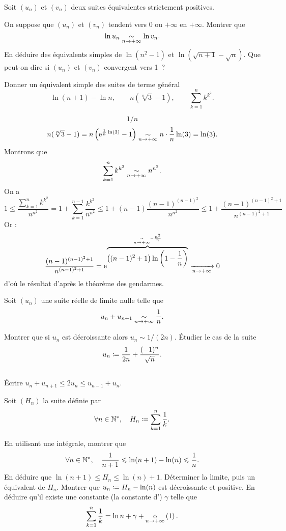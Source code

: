 \documentclass{magnolia}
\begin{document}



Soit $(u_n)$ et $(v_n)$ deux suites équivalentes strictement positives.
\begin{questions}
\question On suppose que $(u_n)$ et $(v_n)$ tendent vers $0$ ou $+\infty$ en
$+\infty$. Montrer que
\[\ln u_n \underset{n\rightarrow +\infty}{\sim} \ln v_n.\]
En déduire des équivalents simples de $\ln(n^2-1)$ et $\ln(\sqrt{n+1}-\sqrt{n})$.
\question Que peut-on dire si $(u_n)$ et $(v_n)$ convergent vers 1~?
\end{questions}

Donner un équivalent simple des suites de terme général
\[\ln(n+1)-\ln n, \qquad n(\sqrt[n]{3}-1), \qquad \sum_{k=1}^n k^{k^2}.\]

\begin{sol}
$$1/n$$
$$n(\sqrt[n]{3}-1)=n\left({\rm e}^{\frac{1}{n}\ln(3)}-1\right)\underset{n\rightarrow +\infty}{\sim}n\cdot \frac{1}{n}\ln(3)=\ln(3).$$
Montrons que $$\sum_{k=1}^n k^{k^2}\underset{n\rightarrow +\infty}{\sim}n^{n^2}.$$
On a $$1\leq \frac{\sum_{k=1}^n k^{k^2}}{n^{n^2}}=1+\sum_{k=1}^{n-1} \frac{k^{k^2}}{n^{n^2}}\leq 1+(n-1)\frac{(n-1)^{(n-1)^2}}{n^{n^2}}\leq 1+\frac{(n-1)^{(n-1)^2+1}}{n^{(n-1)^2+1}}$$
Or : $$\frac{(n-1)^{(n-1)^2+1}}{n^{(n-1)^2+1}}={\rm e}^{\overbrace{\left((n-1)^2+1\right)\ln\left(1-\frac{1}{n}\right)}^{\underset{n\rightarrow +\infty}{\sim}-\frac{n^2}{n}}}\xrightarrow[n\rightarrow +\infty]{}0$$ d'où le résultat d'après le théorème des gendarmes.
\end{sol}


Soit $(u_n)$ une suite réelle de limite nulle telle que
\[u_n+u_{n+1} \underset{n\rightarrow +\infty}{\sim} \frac{1}{n}.\]
\begin{questions}
\question Montrer que si $u_n$ est décroissante alors $u_n \sim 1/(2n)$.
\question Étudier le cas de la suite \[u_n\coloneqq\frac 1{2n}+\frac{(-1)^n}{\sqrt{n}}.\]
\end{questions}
\begin{sol}
$\quad$
\begin{questions}
\question Écrire $u_n+u_{n+1}\leq 2u_n\leq u_{n-1}+u_{n}$.
\end{questions}
\end{sol}

Soit $(H_n)$ la suite définie par
\[\forall n\in{\mathbb{N}^*} ,\quad H_n\coloneqq\sum_{k=1}^n \frac{1}{k}.\]
\begin{questions}
\question En utilisant une intégrale, montrer que
  \[\forall n\in{\mathbb{N}^*},\quad \frac{1}{n + 1} \leqslant \ln(n + 1)-\ln (n) \leqslant\frac{1}{n}.\]
\question En déduire que $\ln (n + 1) \leq H_n \leq \ln (n) + 1$.
\question Déterminer la limite, puis un équivalent de $H_n$.
\question Montrer que $u_n\coloneqq H_n-\ln (n)$ est décroissante et positive. En
  déduire qu'il existe une constante (la constante d') $\gamma$ telle que
 \[\sum_{k = 1}^n \frac 1k = \ln n + \gamma + \underset{n \rightarrow +\infty}{\text{o}}\left(1\right).\]
\end{questions}
\end{document}
